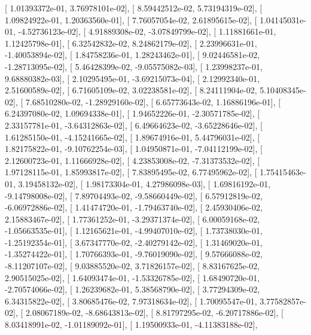 \documentclass{article}
\begin{document}
       [  1.01393372e-01,   3.76978101e-02],
       [  8.59442512e-02,   5.73194319e-02],
       [  1.09824922e-01,   1.20363560e-01],
       [  7.76057054e-02,   2.61895615e-02],
       [  1.04145031e-01,  -4.52736123e-02],
       [  4.91889308e-02,  -3.07849799e-02],
       [  1.11881661e-01,   1.12425798e-01],
       [  6.32542832e-02,   8.24862179e-02],
       [  2.23996631e-01,  -1.40053894e-02],
       [  1.84758236e-01,   1.28243462e-01],
       [  9.02446581e-02,  -1.28713095e-02],
       [  5.46428399e-02,  -9.05575082e-03],
       [  1.23998237e-01,   9.68880382e-03],
       [  2.10295495e-01,  -3.69215073e-04],
       [  2.12992340e-01,   2.51600589e-02],
       [  6.71605109e-02,   3.02238581e-02],
       [  8.24111904e-02,   5.10408345e-02],
       [  7.68510280e-02,  -1.28929160e-02],
       [  6.65773643e-02,   1.16886196e-01],
       [  6.24397080e-02,   1.09694338e-01],
       [  1.94652226e-01,  -2.30571785e-02],
       [  2.33157781e-01,  -3.64312863e-02],
       [  6.49664623e-02,  -3.65228646e-02],
       [  1.61285150e-01,  -4.15241665e-02],
       [  1.89674916e-01,   5.44796031e-02],
       [  1.82175822e-01,  -9.10762254e-03],
       [  1.04950871e-01,  -7.04112199e-02],
       [  2.12600723e-01,   1.11666928e-02],
       [  4.23853008e-02,  -7.31373532e-02],
       [  1.97128115e-01,   1.85993817e-02],
       [  7.83895495e-02,   6.77495962e-02],
       [  1.75415463e-01,   3.19458132e-02],
       [  1.98173304e-01,   4.27986098e-03],
       [  1.69816192e-01,  -9.14798008e-02],
       [  7.89704493e-02,  -9.58660449e-02],
       [  6.57912819e-02,  -6.06972886e-02],
       [  1.41474720e-01,  -1.79463740e-02],
       [  2.45930406e-02,   2.15883467e-02],
       [  1.77361252e-01,  -3.29371374e-02],
       [  6.00059168e-02,  -1.05663535e-01],
       [  1.12165621e-01,  -4.99407010e-02],
       [  1.73738030e-01,  -1.25192354e-01],
       [  3.67347770e-02,  -2.40279142e-02],
       [  1.31469020e-01,  -1.35274422e-01],
       [  1.70766393e-01,  -9.76019090e-02],
       [  9.57666088e-02,  -8.11207107e-02],
       [  9.03885520e-02,   3.71826157e-02],
       [  8.83167625e-02,   2.90515025e-02],
       [  1.64093474e-01,  -1.53326785e-02],
       [  1.68490720e-01,  -2.70574066e-02],
       [  1.26239682e-01,   5.38568790e-02],
       [  3.77294309e-02,   6.34315822e-02],
       [  3.80685476e-02,   7.97318634e-02],
       [  1.70095547e-01,   3.77582857e-02],
       [  2.08067189e-02,  -8.68643813e-02],
       [  8.81797295e-02,  -6.20717886e-02],
       [  8.03418991e-02,  -1.01189092e-01],
       [  1.19500933e-01,  -4.11383188e-02],
\end{document}
